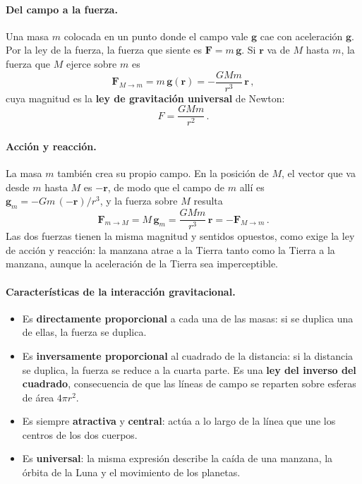 \paragraph{Del campo a la fuerza.}
Una masa $m$ colocada en un punto donde el campo vale $\boldsymbol{g}$ cae con
aceleración $\boldsymbol{g}$. Por la ley de la fuerza, la fuerza que siente es
$\boldsymbol{F} = m\,\boldsymbol{g}$. Si $\boldsymbol{r}$ va de $M$ hasta $m$,
la fuerza que $M$ ejerce sobre $m$ es
\begin{equation}
  \boldsymbol{F}_{M \to m} = m\,\boldsymbol{g}(\boldsymbol{r})
  = -\frac{G M m}{r^{3}}\,\boldsymbol{r} \,,
  \label{eq:GravitationalForce}
\end{equation}
cuya magnitud es la \textbf{ley de gravitación universal} de Newton:
\begin{equation}
  F = \frac{G M m}{r^{2}} \,.
  \label{eq:ley_gravitacion}
\end{equation}

\paragraph{Acción y reacción.}
La masa $m$ también crea su propio campo. En la posición de $M$, el vector
que va desde $m$ hasta $M$ es $-\boldsymbol{r}$, de modo que el campo de $m$
allí es $\boldsymbol{g}_m = -G m\,(-\boldsymbol{r})/r^{3}$, y la fuerza
sobre $M$ resulta
\begin{equation}
  \boldsymbol{F}_{m \to M} = M\,\boldsymbol{g}_m
  = \frac{G M m}{r^{3}}\,\boldsymbol{r}
  = -\boldsymbol{F}_{M \to m} \,.
  \label{eq:gravitacion_accion_reaccion}
\end{equation}
Las dos fuerzas tienen la misma magnitud y sentidos opuestos, como exige la
ley de acción y reacción: la manzana atrae a la Tierra tanto como la Tierra a
la manzana, aunque la aceleración de la Tierra sea imperceptible.

\paragraph{Características de la interacción gravitacional.}
\begin{itemize}
  \item Es \textbf{directamente proporcional} a cada una de las masas: si se
    duplica una de ellas, la fuerza se duplica.
  \item Es \textbf{inversamente proporcional} al cuadrado de la distancia: si
    la distancia se duplica, la fuerza se reduce a la cuarta parte. Es una
    \textbf{ley del inverso del cuadrado}, consecuencia de que las líneas de
    campo se reparten sobre esferas de área $4\pi r^{2}$.
  \item Es siempre \textbf{atractiva} y \textbf{central}: actúa a lo largo de
    la línea que une los centros de los dos cuerpos.
  \item Es \textbf{universal}: la misma expresión describe la caída de una
    manzana, la órbita de la Luna y el movimiento de los planetas.
\end{itemize}

